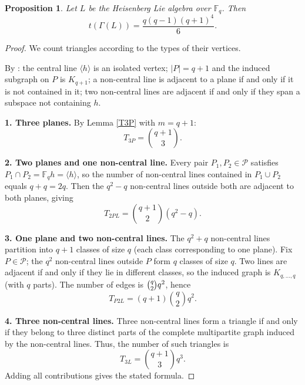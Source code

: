 \documentclass[11pt]{amsart}
\theoremstyle{plain}
\newtheorem{proposition}[theorem]{Proposition}
\def\F{\mathbb{F}}
\begin{document}
\begin{proposition}\label{Heisenberg}
Let $L$ be the Heisenberg Lie algebra over $\F_q$. Then
\[t(\Gamma(L)) = \frac{q(q-1)(q+1)^4}{6}.\]
\end{proposition}

\begin{proof}
We count triangles according to the types of their vertices.


By \cite[Proposition 4.3]{TZG}: the central line $\langle h\rangle$ is an isolated vertex; $|P|=q+1$ and the induced subgraph on $P$ is $K_{q+1}$; a non-central line is adjacent to a plane if and only if it is not contained in it; two non-central lines are adjacent if and only if they span a subspace not containing $h$.


\smallskip

\noindent
\textbf{1. Three planes.} By Lemma \ref{T3P} with $m=q+1$:
\[T_{3P} = \binom{q+1}{3}.\]

\smallskip

\noindent
\textbf{2. Two planes and one non-central line.} Every pair $P_1, P_2\in \mathcal{P}$ satisfies $P_1\cap P_2 = \F_q h = \langle h\rangle$, so  the number of non-central lines contained in $P_1\cup P_2$ equals $q+q=2q$. Then the $q^2-q$
non-central lines outside both are adjacent to both planes, giving
\[T_{2PL} = \binom{q+1}{2}(q^2-q).\]





\noindent
\textbf{3. One plane and two non-central lines.} The $q^2+q$ non-central lines partition into $q+1$ classes of size $q$ (each class corresponding to one plane).  Fix $P\in \mathcal{P}$; the $q^2$ non-central lines outside $P$ form $q$ classes of size $q$.  Two lines are adjacent if and only if they lie in different classes, so the induced graph is $K_{q,\ldots,q}$ (with $q$ parts).  The number of edges is $\tbinom{q}{2}q^2$, hence
\[T_{P2L} = (q+1)\binom{q}{2}q^2.\]

\noindent \textbf{4. Three non-central lines.}
Three non-central lines form a triangle if and only if they belong to three distinct parts of the complete multipartite graph induced by the non-central lines. Thus, the number of such triangles is
\[T_{3L} = \binom{q+1}{3}q^3.\]
Adding all contributions gives the stated formula.
\end{proof}
\end{document}
